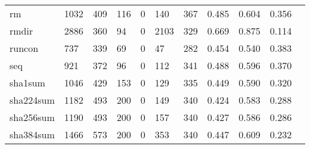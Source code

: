 \begin{longtable}{lp{1.10cm}p{1.10cm}p{1.10cm}p{1.10cm}p{1.10cm}p{1.10cm}p{1.10cm}p{1.10cm}p{1.10cm}p{1.10cm}}
rm        &                   1032 &                                409 &                               116 &                                0 &                               140 &                             367 &                          0.485 &                                 0.604 &                               0.356 \\
rmdir     &                   2886 &                                360 &                                94 &                                0 &                              2103 &                             329 &                          0.669 &                                 0.875 &                               0.114 \\
runcon    &                    737 &                                339 &                                69 &                                0 &                                47 &                             282 &                          0.454 &                                 0.540 &                               0.383 \\
seq       &                    921 &                                372 &                                96 &                                0 &                               112 &                             341 &                          0.488 &                                 0.596 &                               0.370 \\
sha1sum   &                   1046 &                                429 &                               153 &                                0 &                               129 &                             335 &                          0.449 &                                 0.590 &                               0.320 \\
sha224sum &                   1182 &                                493 &                               200 &                                0 &                               149 &                             340 &                          0.424 &                                 0.583 &                               0.288 \\
sha256sum &                   1190 &                                493 &                               200 &                                0 &                               157 &                             340 &                          0.427 &                                 0.586 &                               0.286 \\
sha384sum &                   1466 &                                573 &                               200 &                                0 &                               353 &                             340 &                          0.447 &                                 0.609 &                               0.232 \\

\end{longtable}
